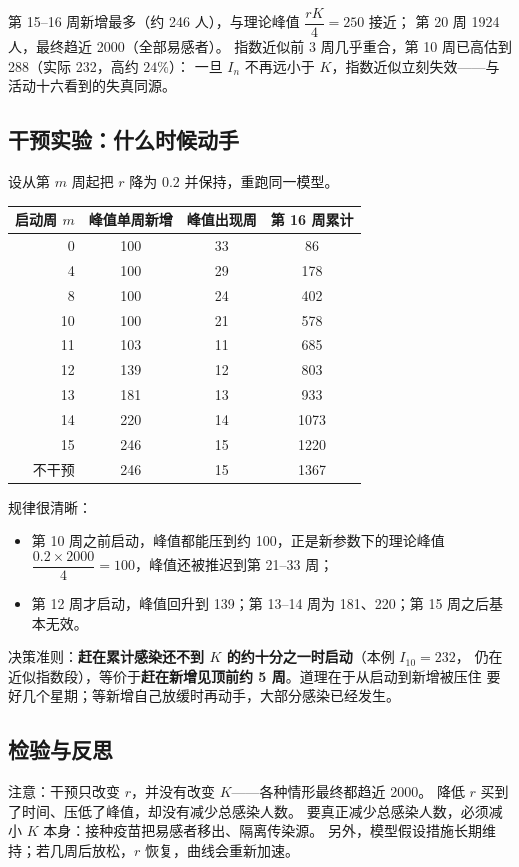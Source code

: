 第 15–16 周新增最多（约 246 人），与理论峰值 $\dfrac{rK}{4}=250$ 接近；
第 20 周 1924 人，最终趋近 2000（全部易感者）。
指数近似前 3 周几乎重合，第 10 周已高估到 288（实际 232，高约 $24\%$）：
一旦 $I_n$ 不再远小于 $K$，指数近似立刻失效——与活动十六看到的失真同源。

\subsection{干预实验：什么时候动手}
设从第 $m$ 周起把 $r$ 降为 $0.2$ 并保持，重跑同一模型。
\begin{center}
\footnotesize
\setlength{\tabcolsep}{5pt}
\renewcommand{\arraystretch}{1.3}
\begin{tabular}{rccc}
\toprule
启动周 $m$ & 峰值单周新增 & 峰值出现周 & 第 16 周累计 \\
\midrule
0 & 100 & 33 & 86 \\
4 & 100 & 29 & 178 \\
8 & 100 & 24 & 402 \\
10 & 100 & 21 & 578 \\
11 & 103 & 11 & 685 \\
12 & 139 & 12 & 803 \\
13 & 181 & 13 & 933 \\
14 & 220 & 14 & 1073 \\
15 & 246 & 15 & 1220 \\
不干预 & 246 & 15 & 1367 \\
\bottomrule
\end{tabular}
\end{center}

规律很清晰：
\begin{itemize}
  \item 第 10 周之前启动，峰值都能压到约 100，正是新参数下的理论峰值
        $\dfrac{0.2\times2000}{4}=100$，峰值还被推迟到第 21–33 周；
  \item 第 12 周才启动，峰值回升到 139；第 13–14 周为 181、220；第 15 周之后基本无效。
\end{itemize}
决策准则：\textbf{赶在累计感染还不到 $K$ 的约十分之一时启动}（本例 $I_{10}=232$，
仍在近似指数段），等价于\textbf{赶在新增见顶前约 5 周}。道理在于从启动到新增被压住
要好几个星期；等新增自己放缓时再动手，大部分感染已经发生。

\subsection{检验与反思}
注意：干预只改变 $r$，并没有改变 $K$——各种情形最终都趋近 2000。
降低 $r$ 买到了时间、压低了峰值，却没有减少总感染人数。
要真正减少总感染人数，必须减小 $K$ 本身：接种疫苗把易感者移出、隔离传染源。
另外，模型假设措施长期维持；若几周后放松，$r$ 恢复，曲线会重新加速。
